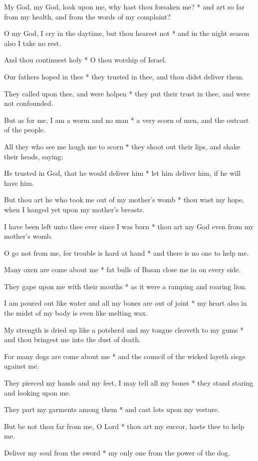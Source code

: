 My God, my God, look upon me, why hast thou forsaken me? * and art so far from my health, and from the words of my complaint?

O my God, I cry in the daytime, but thou hearest not * and in the night season also I take no rest.

And thou continuest holy * O thou worship of Israel.

Our fathers hoped in thee * they trusted in thee, and thou didst deliver them.

They called upon thee, and were holpen * they put their trust in thee, and were not confounded.

But as for me, I am a worm and no man * a very scorn of men, and the outcast of the people.

All they who see me laugh me to scorn * they shoot out their lips, and shake their heads, saying:

He trusted in God, that he would deliver him * let him deliver him, if he will have him.

But thou art he who took me out of my mother's womb * thou wast my hope, when I hanged yet upon my mother's breasts.

I have been left unto thee ever since I was born * thou art my God even from my mother's womb.

O go not from me, for trouble is hard at hand * and there is no one to help me.

Many oxen are come about me * fat bulls of Basan close me in on every side.

They gape upon me with their mouths * as it were a ramping and roaring lion.

I am poured out like water and all my bones are out of joint * my heart also in the midst of my body is even like melting wax.

My strength is dried up like a potsherd and my tongue cleaveth to my gums * and thou bringest me into the dust of death.

For many dogs are come about me * and the council of the wicked layeth siege against me.

They pierced my hands and my feet, I may tell all my bones * they stand staring and looking upon me.

They part my garments among them * and cast lots upon my vesture.

But be not thou far from me, O Lord * thou art my succor, haste thee to help me.

Deliver my soul from the sword * my only one from the power of the dog.

